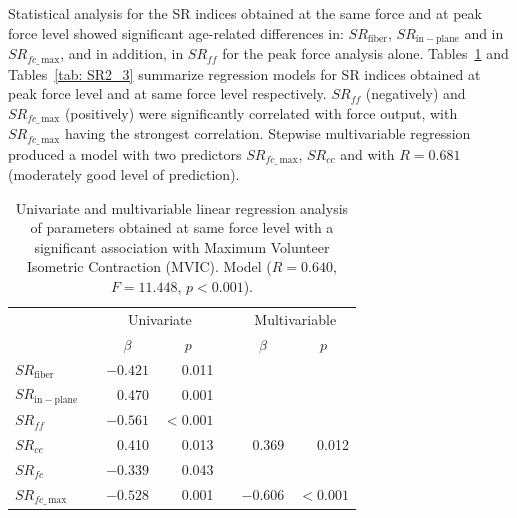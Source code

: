 Statistical analysis for the SR indices obtained at the same force and at peak force level showed significant age-related differences in: $SR_{\mathrm{fiber}}$, $SR_{\mathrm{in-plane}}$ and in $SR_{fc\_\,\mathrm{max}}$, and in addition, in $SR_{ff}$ for the peak force analysis alone. 
Tables~\ref{tab: SR2_2} and Tables~\ref{tab: SR2_3} summarize regression models for SR indices obtained at peak force level and at same force level respectively.
$SR_{ff}$ (negatively) and $SR_{fc\_\,\mathrm{max}}$ (positively) were significantly correlated with force output, with $SR_{fc\_\,\mathrm{max}}$ having the strongest correlation. 
Stepwise multivariable regression produced a model with two predictors $SR_{fc\_\,\mathrm{max}}$, $SR_{cc}$ and with $R=0.681$ (moderately good level of prediction).
\begin{table}[!htb]
\vspace{+0.2cm}
\caption[Univariate and multivariable linear regression analysis of parameters obtained at same force level with maximum volunteer isometric contraction]{Univariate and multivariable linear regression analysis of parameters obtained at same force level with a significant association with Maximum Volunteer Isometric Contraction (MVIC). Model ($R=0.640$, $F=11.448$, $p<0.001$).}
\label{tab: SR2_2}
\begin{center}
\begin{tabular}{@{}llrrrrr@{}}
\toprule[1pt]\midrule[0.3pt]
               && \multicolumn{2}{c}{Univariate} &  & \multicolumn{2}{c}{Multivariable} \\ \cmidrule(lr){3-4} \cmidrule(lr){6-7}
               && \multicolumn{1}{c}{$\beta$}     & \multicolumn{1}{c}{$p$}            &  & \multicolumn{1}{c}{$\beta$}       & \multicolumn{1}{c}{$p$}              \\ \midrule
$SR_{\mathrm{fiber}}$       & & $-0.421$   & 0.011              &  &            &                     \\ [2pt]
$SR_{\mathrm{in-plane}}$    & & 0.470    & 0.001              &  &            & 		                \\ [2pt]
$SR_{ff}$   				& & $-0.561$   & $<0.001$   &  &            &                     \\ [2pt]
$SR_{cc}$ 			   		& & 0.410    & 0.013				  &  & 	0.369	  &   0.012             \\ [2pt]
$SR_{fc}$  					& & $-0.339$   & 0.043              &  &            &                     \\ [2pt]
$SR_{fc\_\,\mathrm{max}}$   & & $-0.528$   & 0.001   			  &  &  $-0.606$    &   $<0.001$  \\ \midrule[0.3pt]\bottomrule[1pt]
\end{tabular}
\end{center}
\vspace{-0.2cm}
\end{table}
